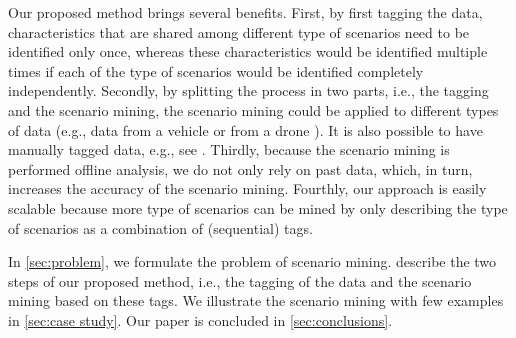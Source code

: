 Our proposed method brings several benefits. 
First, by first tagging the data, characteristics that are shared among different type of scenarios need to be identified only once, whereas these characteristics would be identified multiple times if each of the type of scenarios would be identified completely independently.
Secondly, by splitting the process in two parts, i.e., the tagging and the scenario mining, the scenario mining could be applied to different types of data (e.g., data from a vehicle \autocite{paardekooper2019dataset6000km} or from a drone \autocite{krajewski2018highD}). It is also possible to have manually tagged data, e.g., see \autocite{fontana2018action}. Thirdly, because the scenario mining is performed offline analysis, we do not only rely on past data, which, in turn, increases the accuracy of the scenario mining. Fourthly, our approach is easily scalable because more type of scenarios can be mined by only describing the type of scenarios as a combination of (sequential) tags.

In \cref{sec:problem}, we formulate the problem of scenario mining.  describe the two steps of our proposed method, i.e., the tagging of the data and the scenario mining based on these tags. We illustrate the scenario mining with few examples in \cref{sec:case study}. Our paper is concluded in \cref{sec:conclusions}.

\cenda
